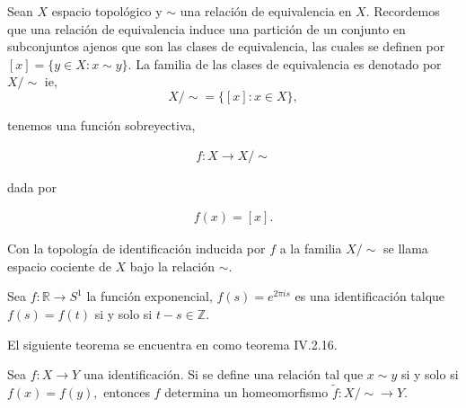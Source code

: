 Sean $X$ espacio topológico y $\sim$ una relación de equivalencia en $X$. Recordemos que una relación de equivalencia induce una partición de un conjunto en subconjuntos ajenos que son las clases de equivalencia, las cuales se definen por $[x]=\{y \in X : x \sim y\}$. La familia de las clases de equivalencia es denotado por $X/ \sim$ ie, $$X/ \sim=\{[x]: x \in X\},$$  

tenemos una función sobreyectiva,

\begin{align*}
f:X \to X / \sim
\end{align*}

dada por

\begin{align*}
f(x)=[x].
\end{align*}

\begin{df}
Con la topología de identificación inducida por $f$ a la familia $X/ \sim$ se llama espacio cociente de $X$ bajo la relación $\sim$. 
\end{df}

\begin{ej}
Sea $f: \mathbb{R} \to S^1$ la función exponencial, $f(s)=e^{2\pi i s}$ es una identificación talque $f(s)=f(t)$ si y solo si $t-s \in \mathbb{Z}$.
\end{ej}

El siguiente teorema se encuentra en \cite{top_prieto} como teorema IV.2.16.

\begin{te} 
Sea $f:X \to Y$ una identificación. Si se define una relación tal que $x \sim y$ si y solo si $f(x)=f(y),$ entonces $f$ determina un homeomorfismo $\tilde{f}:X/ \sim \to Y.$
\end{te}


